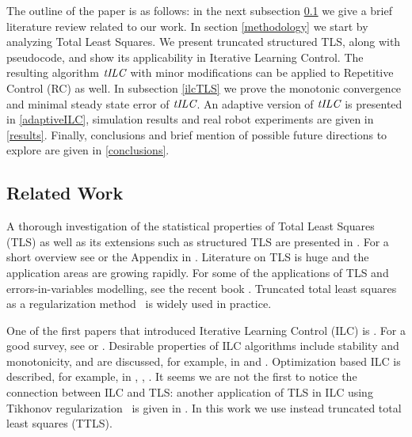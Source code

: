 \documentclass[10pt,a4paper]{article}
\newcommand{\alg}{\emph{tILC}}
\begin{document}
The outline of the paper is as follows: in the next subsection \ref{relatedWork} we give a brief literature review related to our work. In section \ref{methodology} we start by analyzing Total Least Squares. We present truncated structured TLS, along with pseudocode, and show its applicability in Iterative Learning Control. The resulting algorithm $\alg$ with minor modifications can be applied to Repetitive Control (RC) as well. In subsection \ref{ilcTLS} we prove the monotonic convergence and minimal steady state error of $\alg$. An adaptive version of $\alg$ is presented in \ref{adaptiveILC}, simulation results and real robot experiments are given in \ref{results}. Finally, conclusions and brief mention of possible future directions to explore are given in \ref{conclusions}.

\subsection{Related Work}\label{relatedWork}

A thorough investigation of the statistical properties of Total Least Squares (TLS) as well as its extensions such as structured TLS are presented in \cite{VanHuffel91}. For a short overview see \cite{Golub80} or the Appendix in \cite{Golub96}. Literature on TLS is huge and the application areas are growing rapidly. For some of the applications of TLS and errors-in-variables modelling, see the recent book \cite{VanHuffel13}. Truncated total least squares as a regularization method~\cite{Fierro97} is widely used in practice. %

One of the first papers that introduced Iterative Learning Control (ILC) is \cite{Arimoto84}. For a good survey, see \cite{Bristow06} or \cite{Moore07}. Desirable properties of ILC algorithms include stability and monotonicity, and are discussed, for example, in \cite{Norrloef02} and \cite{Bristow06}. Optimization based ILC is described, for example, in \cite{Amann95}, \cite{Bristow06}, \cite{Moore07}. It seems we are not the first to notice the connection between ILC and TLS: another application of TLS in ILC using Tikhonov regularization~\cite{Golub99} is given in \cite{ZhangBo14}. In this work we use instead truncated total least squares (TTLS).

\end{document}
